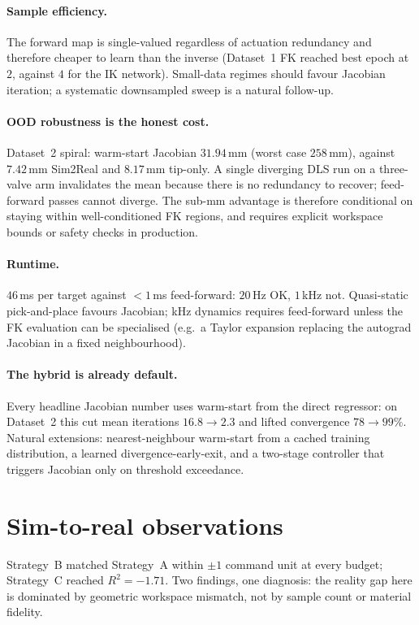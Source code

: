 \paragraph{Sample efficiency.}
The forward map is single-valued regardless of actuation redundancy and therefore cheaper to learn than the inverse (Dataset~1 FK reached best epoch at $2$, against $4$ for the IK network). Small-data regimes should favour Jacobian iteration; a systematic downsampled sweep is a natural follow-up.

\paragraph{OOD robustness is the honest cost.}
Dataset~2 spiral: warm-start Jacobian $31.94$\,mm (worst case $258$\,mm), against $7.42$\,mm Sim2Real and $8.17$\,mm tip-only. A single diverging DLS run on a three-valve arm invalidates the mean because there is no redundancy to recover; feed-forward passes cannot diverge. The sub-mm advantage is therefore conditional on staying within well-conditioned FK regions, and requires explicit workspace bounds or safety checks in production.

\paragraph{Runtime.}
$46$\,ms per target against $<1$\,ms feed-forward: $20$\,Hz OK, $1$\,kHz not. Quasi-static pick-and-place favours Jacobian; kHz dynamics requires feed-forward unless the FK evaluation can be specialised (e.g.\ a Taylor expansion replacing the autograd Jacobian in a fixed neighbourhood).

\paragraph{The hybrid is already default.}
Every headline Jacobian number uses warm-start from the direct regressor: on Dataset~2 this cut mean iterations $16.8 \to 2.3$ and lifted convergence $78 \to 99\%$. Natural extensions: nearest-neighbour warm-start from a cached training distribution, a learned divergence-early-exit, and a two-stage controller that triggers Jacobian only on threshold exceedance.

\section{Sim-to-real observations}
\label{sec:disc_sim}

Strategy~B matched Strategy~A within $\pm 1$ command unit at every budget; Strategy~C reached $R^{2} = -1.71$. Two findings, one diagnosis: the reality gap here is dominated by geometric workspace mismatch, not by sample count or material fidelity.

